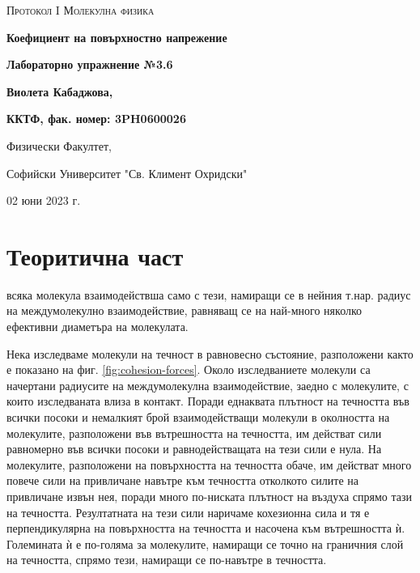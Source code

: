 \documentclass[12pt]{article}
\begin{document}
\begin{titlepage}
	\flushleft
	{\scshape\Large Протокол I \hspace{2cm} Молекулна физика\par}
	\vspace{4cm}
	{\huge\bfseries Коефициент на повърхностно напрежение\par}
	\vspace{1cm}
	{\LARGE\bfseries Лабораторно упражнение №3.6\par}
	\vspace{5cm}
    {\LARGE\bfseries Виолета Кабаджова, \par}
    {\large\bfseries ККТФ, фак. номер: 3PH0600026\par}
	\vspace{1cm}
	
	{\large Физически Факултет, 
	
	Софийски Университет "Св. Климент Охридски"
	
	02 юни 2023 г.\par}
	
\end{titlepage}

\section{Теоритична част}\label{sec:theoretical-part}
всяка молекула взаимодействша само с тези, намиращи се в нейния т.нар. радиус на междумолекулно взаимодействие, равняващ се на най-много няколко ефективни диаметъра на молекулата.

Нека изследваме молекули на течност в равновесно състояние, разположени както е показано на фиг. \ref{fig:cohesion-forces}. Около изследваниете молекули са начертани радиусите на междумолекулна взаимодействие, заедно с молекулите, с които изследваната влиза в контакт. Поради еднаквата плътност на течността във всички посоки и немалкият брой взаимодействащи молекули в околността на молекулите, разположени във вътрешността на течността, им действат сили равномерно във всички посоки и равнодействащата на тези сили е нула. На молекулите, разположени на повърхността на течността обаче, им действат много повече сили на привличане навътре към течността отколкото силите на привличане извън нея, поради много по-ниската плътност на въздуха спрямо тази на течността. Резултатната на тези сили наричаме кохезионна сила и тя е перпендикулярна на повърхността на течността и насочена към вътрешността ѝ. Големината ѝ е по-голяма за молекулите, намиращи се точно на граничния слой на течността, спрямо тези, намиращи се по-навътре в течността.
\end{document}
